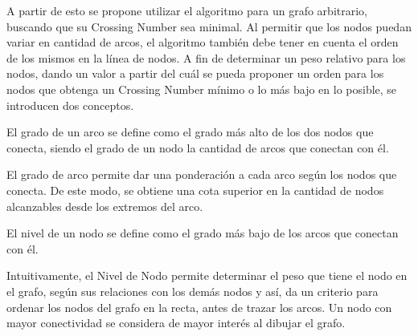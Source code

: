 	
	A partir de esto se propone utilizar el algoritmo para un  grafo arbitrario, buscando que su Crossing Number sea minimal. Al permitir que los nodos puedan variar en cantidad de arcos, el algoritmo también debe tener en cuenta el orden de los mismos en la línea de nodos. A fin de  determinar un peso relativo para los nodos, dando un valor a partir del cuál se pueda proponer un orden para los nodos que obtenga un Crossing Number  mínimo o lo más bajo en lo posible, se introducen dos conceptos.
	
	
	\begin{definition}
		El grado de un arco se define como el grado más alto de los dos nodos que conecta, siendo el grado de un nodo la cantidad de arcos que conectan con él.
	\end{definition}
	
	El grado de arco permite dar una ponderación a cada arco según los nodos que conecta. De este  modo, se obtiene una cota superior en la cantidad de  nodos alcanzables desde los  extremos del arco.
	
	\begin{definition}
		El nivel de un nodo se define como el grado más bajo de los arcos que conectan con él.
	\end{definition}
	
	
	
	Intuitivamente,  el Nivel de Nodo permite determinar el  peso que tiene el nodo en el grafo, según sus relaciones con los demás nodos y así, da un criterio para ordenar los nodos del grafo en la recta,  antes de trazar los arcos. Un nodo con mayor conectividad se considera de mayor interés al  dibujar el grafo. %
	
